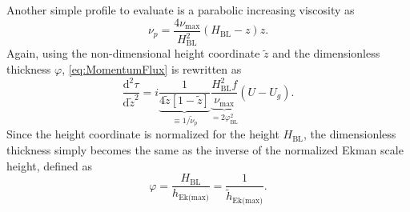 Another simple profile to evaluate is a parabolic increasing viscosity as 
\begin{equation} 
    \nu_p=\frac{4\nu_\text{max}}{H_\text{BL}^2}\left(H_\text{BL}-z\right)z.
    \label{eq:ParabolicProfile}
\end{equation} 
Again, using the non-dimensional height coordinate $\tilde z$ and the dimensionless thickness $\varphi$, \autoref{eq:MomentumFlux} is rewritten as 
\begin{equation}
    \frac{\mathrm{d}^2\tau}{\mathrm{d} \tilde z^2}=i \underbrace{\frac{1}{ 4\tilde z \left[1-\tilde z\right]}}_{\equiv 1/\tilde\nu_p} \underbrace{\frac{H_\text{BL}^2f}{\nu_\text{max}}}_{=2\varphi_\text{BL}^2}(U-U_g).
    \label{eq:SUBCParabolic}
\end{equation}
Since the height coordinate is normalized for the height $H_\text{BL}$, the dimensionless thickness simply becomes the same as the inverse of the normalized Ekman scale height, defined as
\begin{equation}
    \varphi=\frac{H_\text{BL}}{h_\text{Ek{(max)}}}=\frac{1}{\tilde h_\text{Ek{(max)}}}.
\end{equation}
